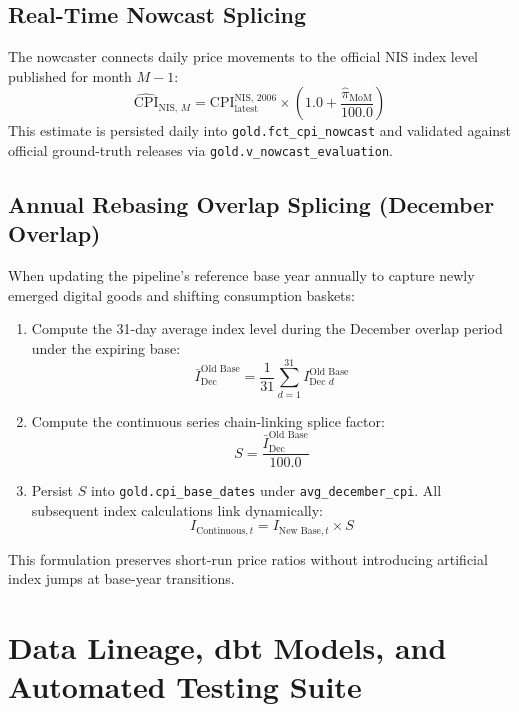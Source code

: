 \documentclass[11pt,a4paper]{article}
\begin{document}
\subsection{Real-Time Nowcast Splicing}
The nowcaster connects daily price movements to the official NIS index level published for month $M-1$:
\begin{equation}
\widehat{\text{CPI}}_{\text{NIS, } M} = \text{CPI}_{\text{latest}}^{\text{NIS, 2006}} \times \left( 1.0 + \frac{\hat{\pi}_{\text{MoM}}}{100.0} \right)
\end{equation}
This estimate is persisted daily into \texttt{gold.fct\_cpi\_nowcast} and validated against official ground-truth releases via \texttt{gold.v\_nowcast\_evaluation}.

\subsection{Annual Rebasing Overlap Splicing (December Overlap)}
When updating the pipeline's reference base year annually to capture newly emerged digital goods and shifting consumption baskets:
\begin{enumerate}
    \item Compute the 31-day average index level during the December overlap period under the expiring base:
    \begin{equation}
    \bar{I}_{\text{Dec}}^{\text{Old Base}} = \frac{1}{31} \sum_{d=1}^{31} I_{\text{Dec } d}^{\text{Old Base}}
    \end{equation}
    \item Compute the continuous series chain-linking splice factor:
    \begin{equation}
    S = \frac{\bar{I}_{\text{Dec}}^{\text{Old Base}}}{100.0}
    \end{equation}
    \item Persist $S$ into \texttt{gold.cpi\_base\_dates} under \texttt{avg\_december\_cpi}. All subsequent index calculations link dynamically:
    \begin{equation}
    I_{\text{Continuous}, t} = I_{\text{New Base}, t} \times S
    \end{equation}
\end{enumerate}
This formulation preserves short-run price ratios without introducing artificial index jumps at base-year transitions.

\newpage

\section{Data Lineage, dbt Models, and Automated Testing Suite}
\end{document}
